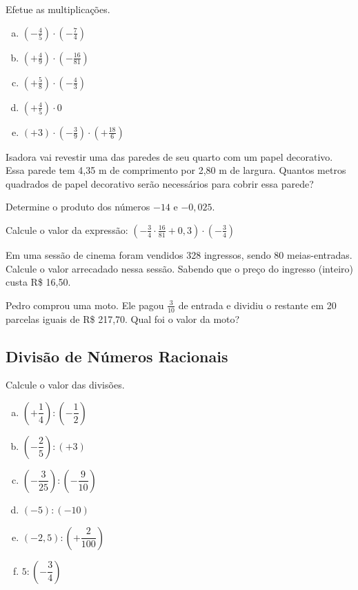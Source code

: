 \item Efetue as multiplicações.
\begin{multicols}{2}
\begin{enumerate}[a)]
	\item $\left(-\displaystyle\frac{4}{5}\right)\cdot \left(-\displaystyle\frac{7}{4}\right)$
	\item $\left(+\displaystyle\frac{4}{9}\right)\cdot \left(-\displaystyle\frac{16}{81}\right)$
	\item $\displaystyle\left(+\frac{5}{8}\right)\cdot\left(-\frac{4}{3}\right)$
	\item $\left(+\displaystyle\frac{4}{5}\right)\cdot 0$
	\item $(+3)\cdot\displaystyle\left(-\frac{3}{9}\right)\cdot\left(+\frac{18}{6}\right)$
\end{enumerate}
\end{multicols}

\item Isadora vai revestir uma das paredes de seu quarto com um papel decorativo. Essa parede tem 4,35 m de comprimento por 2,80 m de largura. Quantos metros quadrados de papel decorativo serão necessários para cobrir essa parede?

\item Determine o produto dos números $-14$ e $-0,025$.

\item Calcule o valor da expressão: $\left(-\displaystyle\frac{3}{4}\cdot\frac{16}{81} +0,3\right)\cdot \left(-\displaystyle\frac{3}{4}\right)$

\item Em uma sessão de cinema foram vendidos 328 ingressos, sendo 80 meias-entradas. Calcule o valor arrecadado nessa sessão. Sabendo que o preço do ingresso (inteiro) custa R\$ 16,50.

\item Pedro comprou uma moto. Ele pagou $\displaystyle\frac{3}{10}$ de entrada e dividiu o restante em 20 parcelas iguais de R\$ 217,70. Qual foi o valor da moto?


\subsection{Divisão de Números Racionais}


\item Calcule o valor das divisões.
\begin{multicols}{2}
\begin{enumerate}[a)]
	\item $\left(+\dfrac{1}{4}\right): \left(-\dfrac{1}{2}\right)$
	\item $\left(-\dfrac{2}{5}\right): (+3)$
	\item $\left(-\dfrac{3}{25}\right): \left(-\dfrac{9}{10}\right)$
	\item $(-5):(-10)$
	\item $(-2,5):\left(+\dfrac{2}{100}\right)$
	\item $5:\left(-\dfrac{3}{4}\right)$
\end{enumerate}
\end{multicols}

